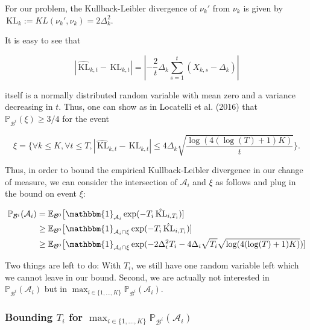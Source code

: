 \documentclass[12pt,]{article}
\newcommand{\KL}{\,\text{KL}}
\begin{document}
For our problem, the Kullback-Leibler divergence of \(\nu_k'\) from
\(\nu_k\) is given by \(\KL_k := KL(\nu_k', \nu_k) = 2\Delta_k^2\).

It is easy to see that

\begin{equation*}
|\hat{\KL}_{k,t} - \KL_{k,t}| = |-\frac{2}{t} \Delta_k \sum_{s=1}^{t}(X_{k,s} - \Delta_k)|
\end{equation*}

itself is a normally distributed random variable with mean zero and a
variance decreasing in \(t\). Thus, one can show as in Locatelli et al.
(2016) that \(\mathbb{P}_{\mathcal{B}^i}(\xi) \geq 3/4\) for the event

\begin{equation}
\xi = \{ \forall k \leq K, \forall t \leq T, |\hat{\KL}_{k,t} - \KL_{k,t}| \leq 4 \Delta_k \sqrt{\frac{\log(4(\log(T)+1)K)}{t}}\}. \label{LocatelliTheorem1EventXi}
\end{equation}

Thus, in order to bound the empirical Kullback-Leibler divergence in our
change of measure, we can consider the intersection of \(\mathcal{A}_i\)
and \(\xi\) as follows and plug in the bound on event \(\xi\):

\begin{align*}
\mathbb{P}_{\mathcal{B}^i}(\mathcal{A}_i) & = \mathbb{E}_{\mathcal{B}^0} \big[\mathbbm{1}_{\mathcal{A}_i} \exp (- T_i \hat{\KL}_{i,T_i}) ] \\
& \geq \mathbb{E}_{\mathcal{B}^0} \big[\mathbbm{1}_{\mathcal{A}_i \cap \xi} \exp (- T_i \hat{\KL}_{i,T_i}) ] \\
& \geq \mathbb{E}_{\mathcal{B}^0} \big[\mathbbm{1}_{\mathcal{A}_i \cap \xi} \exp (- 2 \Delta_i^2 T_i - 4 \Delta_i \sqrt{T_i} \sqrt{\log(4(\log(T)+1)K)}) ]
\end{align*}

Two things are left to do: With \(T_i\), we still have one random
variable left which we cannot leave in our bound. Second, we are
actually not interested in \(\mathbb{P}_{\mathcal{B}^i}(\mathcal{A}_i)\)
but in
\(\max_{i \in \{1,\dots,K\}} \mathbb{P}_{\mathcal{B}^i}(\mathcal{A}_i)\).

\subsubsection{\texorpdfstring{Bounding \(T_i\) for
\(\max_{i \in \{1,\dots,K\}}\mathbb{P}_{\mathcal{B}^i}(\mathcal{A}_i)\)}{Bounding T\_i for \textbackslash{}max\_\{i \textbackslash{}in \textbackslash{}\{1,\textbackslash{}dots,K\textbackslash{}\}\}\textbackslash{}mathbb\{P\}\_\{\textbackslash{}mathcal\{B\}\^{}i\}(\textbackslash{}mathcal\{A\}\_i)}}\label{bounding-t_i-for-max_i-in-1dotskmathbbp_mathcalbimathcala_i}
\end{document}
